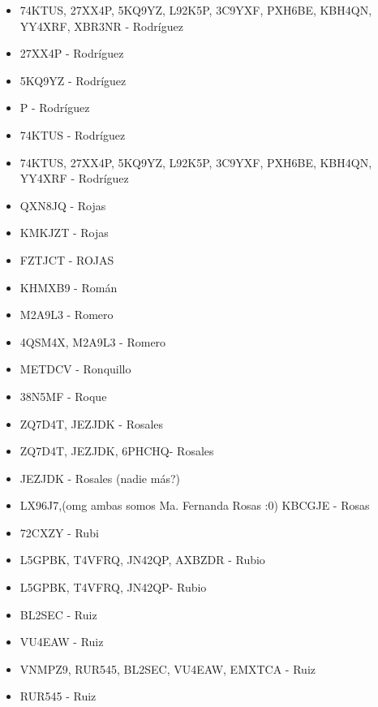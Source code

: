 \begin{itemize}[leftmargin=*,nosep]
\item 74KTUS, 27XX4P, 5KQ9YZ, L92K5P, 3C9YXF, PXH6BE, KBH4QN, YY4XRF, XBR3NR - Rodríguez
\item 27XX4P  -  Rodríguez
\item 5KQ9YZ - Rodríguez
\item P  -  Rodríguez
\item 74KTUS - Rodríguez
\item 74KTUS, 27XX4P, 5KQ9YZ, L92K5P, 3C9YXF, PXH6BE, KBH4QN, YY4XRF - Rodríguez
\item QXN8JQ - Rojas
\item KMKJZT  -  Rojas
\item FZTJCT - ROJAS
\item KHMXB9 - Román
\item M2A9L3  -  Romero
\item 4QSM4X, M2A9L3 - Romero
\item METDCV - Ronquillo
\item 38N5MF  -  Roque
\item ZQ7D4T, JEZJDK - Rosales
\item ZQ7D4T, JEZJDK, 6PHCHQ- Rosales
\item JEZJDK - Rosales (nadie más?)
\item LX96J7,(omg ambas somos Ma. Fernanda Rosas :0) KBCGJE  -  Rosas
\item 72CXZY - Rubi
\item L5GPBK, T4VFRQ, JN42QP, AXBZDR - Rubio
\item L5GPBK, T4VFRQ, JN42QP-  Rubio
\item BL2SEC - Ruiz
\item VU4EAW  -  Ruiz
\item VNMPZ9, RUR545, BL2SEC, VU4EAW, EMXTCA - Ruiz
\item RUR545  -  Ruiz
\end{itemize}

